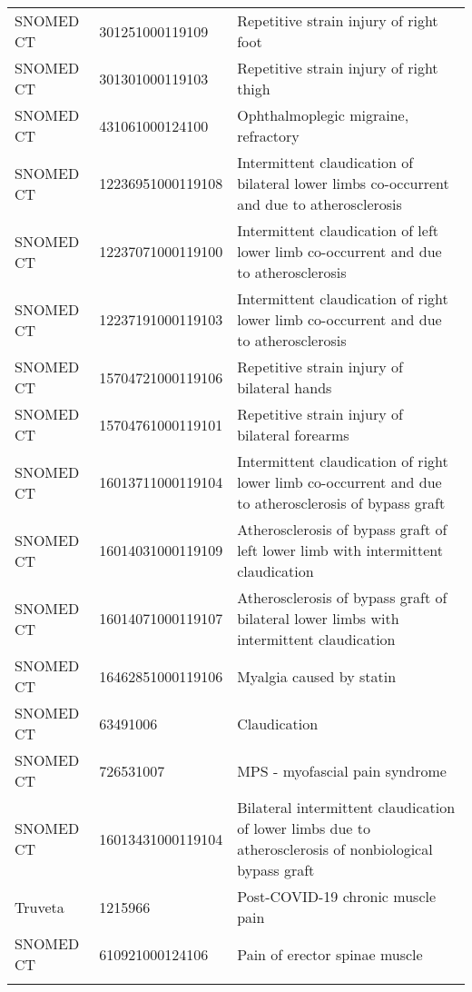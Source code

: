 \begin{longtable}{p{}p{}p{}}
  SNOMED CT & 301251000119109 & Repetitive strain injury of right foot \\ 
  SNOMED CT & 301301000119103 & Repetitive strain injury of right thigh \\ 
  SNOMED CT & 431061000124100 & Ophthalmoplegic migraine, refractory \\ 
  SNOMED CT & 12236951000119108 & Intermittent claudication of bilateral lower limbs co-occurrent and due to atherosclerosis \\ 
  SNOMED CT & 12237071000119100 & Intermittent claudication of left lower limb co-occurrent and due to atherosclerosis \\ 
  SNOMED CT & 12237191000119103 & Intermittent claudication of right lower limb co-occurrent and due to atherosclerosis \\ 
  SNOMED CT & 15704721000119106 & Repetitive strain injury of bilateral hands \\ 
  SNOMED CT & 15704761000119101 & Repetitive strain injury of bilateral forearms \\ 
  SNOMED CT & 16013711000119104 & Intermittent claudication of right lower limb co-occurrent and due to atherosclerosis of bypass graft \\ 
  SNOMED CT & 16014031000119109 & Atherosclerosis of bypass graft of left lower limb with intermittent claudication \\ 
  SNOMED CT & 16014071000119107 & Atherosclerosis of bypass graft of bilateral lower limbs with intermittent claudication \\ 
  SNOMED CT & 16462851000119106 & Myalgia caused by statin \\ 
  SNOMED CT & 63491006 & Claudication \\ 
  SNOMED CT & 726531007 & MPS - myofascial pain syndrome \\ 
  SNOMED CT & 16013431000119104 & Bilateral intermittent claudication of lower limbs due to atherosclerosis of nonbiological bypass graft \\ 
  Truveta & 1215966 & Post-COVID-19 chronic muscle pain \\ 
  SNOMED CT & 610921000124106 & Pain of erector spinae muscle \\ 
  \hline
\label{tab:codes_myalgia}
\end{longtable}
